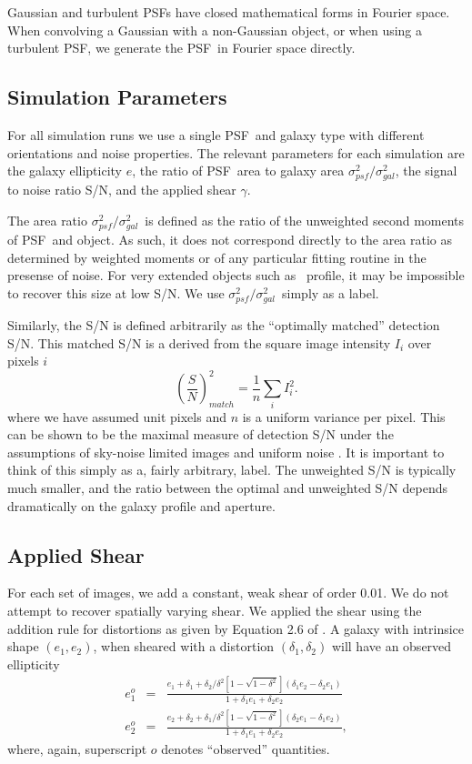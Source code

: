 \documentclass[10pt,preprint]{aastex}
\newcommand{\aratio}{\ensuremath{\sigma^2_{psf}/\sigma^2_{gal}}}
\newcommand{\psf}{PSF}
\begin{document}
Gaussian and turbulent \psf s have closed mathematical forms in Fourier space.
When convolving a Gaussian with a non-Gaussian object, or when using a
turbulent \psf, we generate the \psf\ in Fourier space directly.

\subsection{Simulation Parameters}

For all simulation runs we use a single \psf\ and galaxy type with different
orientations and noise properties.  The relevant parameters for each simulation
are the galaxy ellipticity $e$, the ratio of \psf\ area to galaxy area \aratio,
the signal to noise ratio S/N, and the applied shear $\gamma$.

The area ratio \aratio\ is defined as the ratio of the unweighted second
moments of \psf\ and object.  As such, it does not correspond directly to the
area ratio as determined by weighted moments or of any particular fitting
routine in the presense of noise.  For very extended objects such as \devauc\
profile, it may be impossible to recover this size at low S/N.  We use \aratio\
simply as a label.

Similarly, the S/N is defined arbitrarily as the ``optimally matched''
detection S/N.  This matched S/N is a derived from the square image intensity
$I_i$ over pixels $i$
\begin{equation}
\left(\frac{S}{N}\right)^2_{match} = \frac{1}{n} \sum_{i} I_i^2.
\end{equation}
where we have assumed unit pixels and $n$ is a uniform variance per pixel.
This can be shown to be the maximal measure of detection S/N under the
assumptions of sky-noise limited images and uniform noise \citep{plazasthesis}.
It is important to think of this simply as a, fairly arbitrary, label.  The
unweighted S/N is typically much smaller, and the ratio between the optimal and
unweighted S/N depends dramatically on the galaxy profile and aperture.

\subsection{Applied Shear} \label{sec:sim:shear}

For each set of images, we add a constant, weak shear of order 0.01.  We do not
attempt to recover spatially varying shear.  We applied the shear using the
addition rule for distortions as given by Equation 2.6 of
\citet{Escude91}. A galaxy with intrinsice shape $(e_1,e_2)$, when
sheared with a distortion $(\delta_1, \delta_2)$ will have an observed
ellipticity
\begin{eqnarray}
e_1^o  & = & \frac
{e_1 + \delta_1 + \delta_2/\delta^2\left[1 - \sqrt{1-\delta^2}\right]\left( \delta_1 e_2 - \delta_2 e_1\right)}
{1 + \delta_1 e_1 + \delta_2 e_2 } \\
e_2^o  & = & \frac
{e_2 + \delta_2 + \delta_1/\delta^2\left[1 - \sqrt{1-\delta^2}\right]\left( \delta_2 e_1 - \delta_1 e_2\right)}
{1 + \delta_1 e_1 + \delta_2 e_2 },
\end{eqnarray}
where, again, superscript $o$ denotes ``observed'' quantities.
\end{document}
